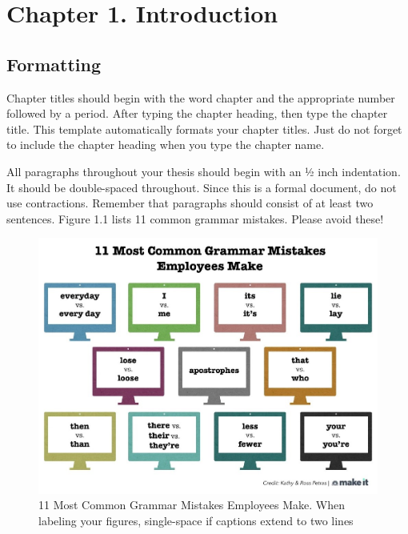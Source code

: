 
\chapter{Chapter 1. Introduction}%

\section{Formatting}

Chapter titles should begin with the word chapter and the appropriate number followed by a period. After typing the chapter heading, then type the chapter title. This template automatically formats your chapter titles. Just do not forget to include the chapter heading when you type the chapter name.

All paragraphs throughout your thesis should begin with an ½ inch indentation. It should be double-spaced throughout. Since this is a formal document, do not use contractions. Remember that paragraphs should consist of at least two sentences. Figure 1.1 lists 11 common grammar mistakes. Please avoid these!
\begin{figure}[ht]
    \centering
    \includegraphics[scale=.7]{Figures/figure 1.1.jpg}
    \caption[11 Most Common Grammar Mistakes Employees Make: I'm purposely making this longer to extend to two lines.]{11 Most Common Grammar Mistakes Employees Make. When labeling your figures, single-space if captions extend to two lines}
    \label{fig 1.1}
\end{figure}

